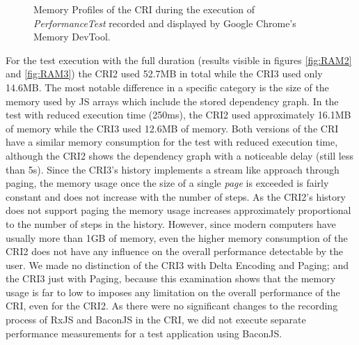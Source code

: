 \begin{figure}[!h]
		\hspace{1cm}
		\caption{Memory Profiles of the CRI during the execution of \emph{PerformanceTest} recorded and displayed by Google Chrome's Memory DevTool.}
	\end{figure}
	For the test execution with the full duration (results visible in figures \ref{fig:RAM2} and \ref{fig:RAM3}) the CRI2 used 52.7MB in total while the CRI3 used only 14.6MB. The most notable difference in a specific category is the size of the memory used by JS arrays which include the stored dependency graph. In the test with reduced execution time (250ms), the CRI2 used approximately 16.1MB of memory while the CRI3 used 12.6MB of memory. Both versions of the CRI have a similar memory consumption for the test with reduced execution time, although the CRI2 shows the dependency graph with a noticeable delay (still less than 5s). Since the CRI3's history implements a stream like approach through paging, the memory usage once the size of a single \emph{page} is exceeded is fairly constant and does not increase with the number of steps. As the CRI2's history does not support paging the memory usage increases approximately proportional to the number of steps in the history. However, since modern computers have usually more than 1GB of memory, even the higher memory consumption of the CRI2 does not have any influence on the overall performance detectable by the user. We made no distinction of the CRI3 with Delta Encoding and Paging; and the CRI3 just with Paging, because this examination shows that the memory usage is far to low to imposes any limitation on the overall performance of the CRI, even for the CRI2. As there were no significant changes to the recording process of RxJS and BaconJS in the CRI, we did not execute separate performance measurements for a test application using BaconJS.
	
